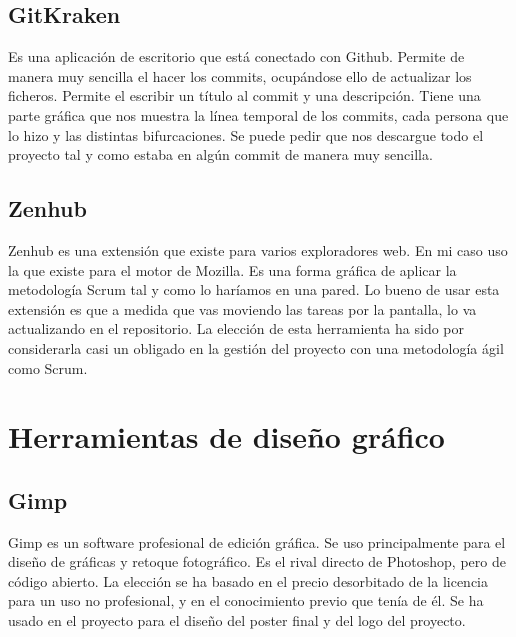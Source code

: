\subsection{GitKraken}
Es una aplicación de escritorio que está conectado con Github.
Permite de manera muy sencilla el hacer los commits, ocupándose ello de actualizar los ficheros. Permite el escribir un título al commit y una descripción.
Tiene una parte gráfica que nos muestra la línea temporal de los commits, cada persona que lo hizo y las distintas bifurcaciones.
Se puede pedir que nos descargue todo el proyecto tal y como estaba en algún commit de manera muy sencilla. 
\subsection{Zenhub}
Zenhub es una extensión que existe para varios exploradores web. En mi caso uso la que existe para el motor de Mozilla.
Es una forma gráfica de aplicar la metodología Scrum tal y como lo haríamos en una pared. Lo bueno de usar esta extensión es que a medida que vas moviendo las tareas por la pantalla, lo va actualizando en el repositorio.
La elección de esta herramienta ha sido por considerarla casi un obligado en la gestión del proyecto con una metodología ágil como Scrum.

\section{Herramientas de diseño gráfico}
\subsection{Gimp}
Gimp es un software profesional de edición gráfica. Se uso principalmente para el diseño de gráficas y retoque fotográfico. Es el rival directo de Photoshop, pero de código abierto. 
La elección se ha basado en el precio desorbitado de la licencia para un uso no profesional, y en el conocimiento previo que tenía de él.
Se ha usado en el proyecto para el diseño del poster final y del logo del proyecto.

